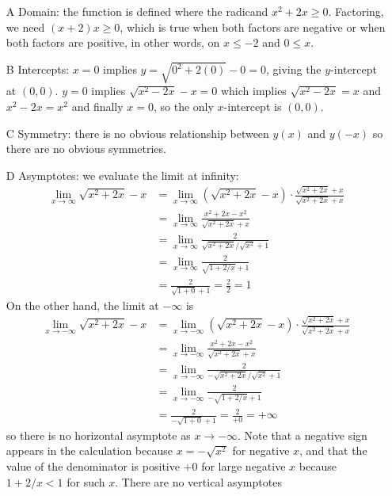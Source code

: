\documentclass{article}
\begin{document}
\begin{enumerate}
\begin{enumerate}
    \begin{itemize}
    \item[A] Domain: the function is defined where the radicand
      $x^2+2x\ge 0$.  Factoring, we need $(x+2)x\ge 0$, which is true
      when both factors are negative or when both factors are
      positive, in other words, on $x\le -2$ and $0\le x$.
    \item[B] Intercepts: $x=0$ implies $y=\sqrt{0^2+2(0)}-0=0$, giving
      the $y$-intercept at $(0,0)$.  $y=0$ implies $\sqrt{x^2-2x}-x=0$
      which implies $\sqrt{x^2-2x}=x$ and $x^2-2x=x^2$ and finally
      $x=0$, so the only $x$-intercept is $(0,0)$.
    \item[C] Symmetry: there is no obvious relationship between $y(x)$
      and $y(-x)$ so there are no obvious symmetries.
    \item[D] Asymptotes: we evaluate the limit at infinity:
      \begin{align*}
        \lim_{x\to\infty} \sqrt{x^2+2x}-x
        &= \lim_{x\to\infty} (\sqrt{x^2+2x}-x)\cdot
          \frac{\sqrt{x^2+2x}+x}{\sqrt{x^2+2x}+x} \\
        &= \lim_{x\to\infty} \frac{x^2+2x-x^2}{\sqrt{x^2+2x}+x} \\
        &= \lim_{x\to\infty} \frac{2}{\sqrt{x^2+2x}/\sqrt{x^2}+1} \\
        &= \lim_{x\to\infty} \frac{2}{\sqrt{1+2/x}+1} \\
        &= \frac{2}{\sqrt{1+0}+1} = \frac{2}{2} = 1
      \end{align*}
      On the other hand, the limit at $-\infty$ is
      \begin{align*}
        \lim_{x\to -\infty} \sqrt{x^2+2x}-x
        &= \lim_{x\to -\infty} (\sqrt{x^2+2x}-x)\cdot
          \frac{\sqrt{x^2+2x}+x}{\sqrt{x^2+2x}+x} \\
        &= \lim_{x\to -\infty} \frac{x^2+2x-x^2}{\sqrt{x^2+2x}+x} \\
        &= \lim_{x\to -\infty} \frac{2}{-\sqrt{x^2+2x}/\sqrt{x^2}+1} \\
        &= \lim_{x\to -\infty} \frac{2}{-\sqrt{1+2/x}+1} \\
        &= \frac{2}{-\sqrt{1+0}+1} = \frac{2}{+0} = +\infty
      \end{align*}
      so there is no horizontal asymptote as $x\to -\infty$.  Note
      that a negative sign appears in the calculation because
      $x=-\sqrt{x^2}$ for negative $x$, and that the value of the
      denominator is positive $+0$ for large negative $x$ because
      $1+2/x<1$ for such $x$.  There are no vertical asymptotes

\end{itemize}
\end{enumerate}
\end{enumerate}
\end{document}

